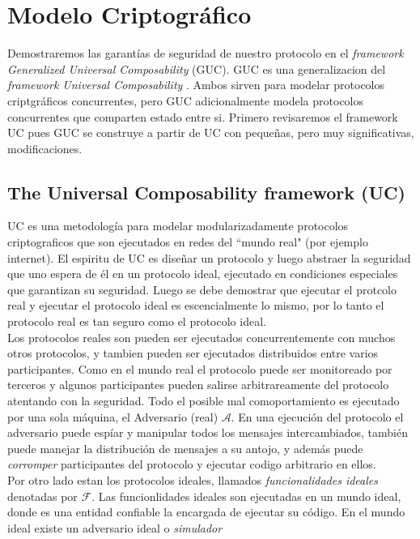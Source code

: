 \chapter{Modelo Criptográfico}

Demostraremos las garantías de seguridad de nuestro protocolo en el
\textit{framework Generalized Universal Composability} (GUC). GUC \cite{conf/tcc/CanettiDPW07}
es una generalizacion del \textit{framework Universal Composability}
\cite{conf/focs/Canetti01}. Ambos sirven para modelar protocolos criptgráficos concurrentes,
pero GUC adicionalmente modela protocolos concurrentes que comparten estado entre si.
Primero revisaremos el framework UC pues GUC se construye a partir de UC con pequeñas,
pero muy significativas, modificaciones.\\

\section{The Universal Composability framework (UC)}
\label{sect:uc}
UC es una metodología para modelar modularizadamente protocolos criptograficos que son ejecutados en redes
del ``mundo real" (por ejemplo internet). El espiritu de UC es diseñar un protocolo y luego abstraer la
seguridad que uno espera de él en un protocolo ideal, ejecutado en condiciones especiales que garantizan
su seguridad. Luego se debe demostrar que ejecutar el protcolo real y ejecutar el protocolo ideal es
escencialmente lo mismo, por lo tanto el protocolo real es tan seguro como el protocolo ideal.\\
Los protocolos reales son pueden ser ejecutados concurrentemente con muchos otros protocolos,
y tambien pueden ser ejecutados distribuidos entre varios participantes.
Como en el mundo real el protocolo puede ser monitoreado por terceros y algunos participantes pueden salirse
arbitrareamente del protocolo atentando con la seguridad. Todo el posible mal comoportamiento es ejecutado por una sola
máquina, el Adversario (real) $\mathcal{A}$. En una ejecución del protocolo el adversario puede espíar y
manipular todos los mensajes intercambiados, también puede manejar la distribución de mensajes a su antojo,
y además puede \textit{corromper} participantes del protocolo y ejecutar codigo arbitrario en ellos.\\
Por otro lado estan los protocolos ideales, llamados \textit{funcionalidades ideales} denotadas por 
$\mathcal{F}$. Las funcionlidades ideales son ejecutadas en un mundo ideal, donde es una entidad confiable
la encargada de ejecutar su código. En el mundo ideal existe un adversario ideal o \textit{simulador}
